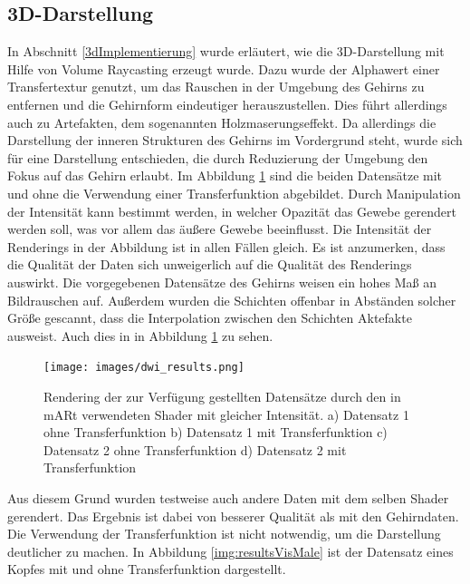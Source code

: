 \subsection{3D-Darstellung}

In Abschnitt \ref{3dImplementierung} wurde erläutert, wie die 3D-Darstellung mit Hilfe von Volume Raycasting erzeugt wurde. 
Dazu wurde der Alphawert einer Transfertextur genutzt, um das Rauschen in der Umgebung des Gehirns zu entfernen und die Gehirnform eindeutiger herauszustellen. Dies führt allerdings auch zu Artefakten, dem sogenannten Holzmaserungseffekt. Da allerdings die Darstellung der inneren Strukturen des Gehirns im Vordergrund steht, wurde sich für eine Darstellung entschieden, die durch Reduzierung der Umgebung den Fokus auf das Gehirn erlaubt. 
Im Abbildung \ref{img:resultsDWI} sind die beiden Datensätze mit und ohne die Verwendung einer Transferfunktion abgebildet. Durch Manipulation der Intensität kann bestimmt werden, in welcher Opazität das Gewebe gerendert werden soll, was vor allem das äußere Gewebe beeinflusst. Die Intensität der Renderings in der Abbildung ist in allen Fällen gleich.
Es ist anzumerken, dass die Qualität der Daten sich unweigerlich auf die Qualität des Renderings auswirkt. Die vorgegebenen Datensätze des Gehirns weisen ein hohes Maß an Bildrauschen auf. Außerdem wurden die Schichten offenbar in Abständen solcher Größe gescannt, dass die Interpolation zwischen den Schichten Aktefakte ausweist. Auch dies in in Abbildung \ref{img:resultsDWI} zu sehen.

\begin{figure}[!htb]
	\centering
	\texttt{[image: images/dwi\_results.png]}
	\caption{Rendering der zur Verfügung gestellten Datensätze durch den in mARt verwendeten Shader mit gleicher Intensität. a) Datensatz 1 ohne Transferfunktion b) Datensatz 1 mit Transferfunktion c) Datensatz 2 ohne Transferfunktion d) Datensatz 2 mit Transferfunktion}
	\label{img:resultsDWI}
\end{figure}
\FloatBarrier
  
Aus diesem Grund wurden testweise auch andere Daten mit dem selben Shader gerendert. Das Ergebnis ist dabei von besserer Qualität als mit den Gehirndaten. Die Verwendung der Transferfunktion ist nicht notwendig, um die Darstellung deutlicher zu machen. In Abbildung \ref{img:resultsVisMale} ist der Datensatz eines Kopfes mit und ohne Transferfunktion dargestellt.
  
